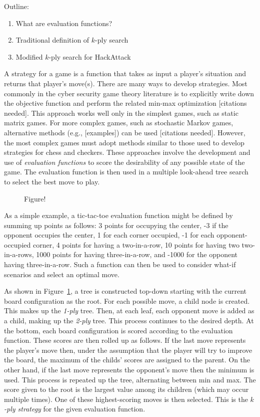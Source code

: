 Outline:
\begin{enumerate}
\item What are evaluation functions?
\item Traditional definition of $k$-ply search
\item Modified $k$-ply search for HackAttack
\end{enumerate}

A strategy for a game is a function that takes as input a player's situation and returns that player's move(s). There are many ways to develop strategies. Most commonly in the cyber security game theory literature is to explicitly write down the objective function and perform the related min-max optimization [citations needed]. This approach works well only in the simplest games, such as static matrix games. For more complex games, such as stochastic Markov games, alternative methods (e.g., [examples]) can be used [citations needed]. However, the most complex games must adopt methods similar to those used to develop strategies for chess and checkers. These approaches involve the development and use of {\em evaluation functions} to score the desirability of any possible state of the game. The evaluation function is then used in a multiple look-ahead tree search to select the best move to play.

\begin{figure}[h!tbp]
[Insert picture of a tree showing min-max strategy] 
\caption{Figure!\label{fig:minmaxtree}}
\end{figure}

As a simple example, a tic-tac-toe evaluation function might be defined by summing up points as follows: 3 points for occupying the center, -3 if the opponent occupies the center, 1 for each corner occupied, -1 for each opponent-occupied corner, 4 points for having a two-in-a-row, 10 points for having two two-in-a-rows, 1000 points for having three-in-a-row, and -1000 for the opponent having three-in-a-row. Such a function can then be used to consider what-if scenarios and select an optimal move.

As shown in Figure~\ref{fig:minmaxtree}, a tree is constructed top-down starting with the current board configuration as the root. For each possible move, a child node is created. This makes up the {\em 1-ply} tree. Then, at each leaf, each opponent move is added as a child, making up the {\em 2-ply} tree. This process continues to the desired depth. At the bottom, each board configuration is scored according to the evaluation function. These scores are then rolled up as follows. If the last move represents the player's move then, under the assumption that the player will try to improve the board, the maximum of the childs' scores are assigned to the parent. On the other hand, if the last move represents the opponent's move then the minimum is used. This process is repeated up the tree, alternating between min and max. The score given to the root is the largest value among its children (which may occur multiple times). One of these highest-scoring moves is then selected. This is the {\em $k$-ply strategy} for the given evaluation function.

